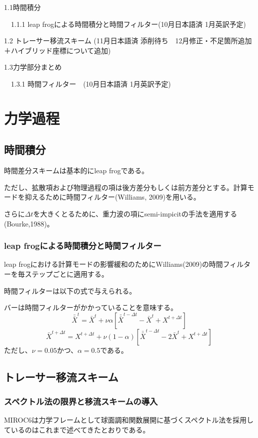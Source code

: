 \documentclass{jsbook}
\begin{document}
1.1時間積分

　1.1.1 leap frogによる時間積分と時間フィルター(10月日本語済 1月英訳予定)

1.2 トレーサー移流スキーム (11月日本語済 添削待ち　12月修正・不足箇所追加＋ハイブリッド座標について追加)

1.3力学部分まとめ

　1.3.1 時間フィルター　(10月日本語済 1月英訳予定)
\chapter{力学過程}
\section{時間積分}
時間差分スキームは基本的にleap frogである。

ただし、拡散項および物理過程の項は後方差分もしくは前方差分とする。計算モードを抑えるために時間フィルター(Williams, 2009)を用いる。

さらに$\Delta t$を大きくとるために、重力波の項にsemi-impicitの手法を適用する(Bourke,1988)。
\subsection{leap frogによる時間積分と時間フィルター}
leap frogにおける計算モードの影響緩和のためにWilliams(2009)の時間フィルターを毎ステップごとに適用する。

時間フィルターは以下の式で与えられる。

バーは時間フィルターがかかっていることを意味する。
\begin{equation}   
\bar{\bar{X}}^{t} = \bar{X}^{t} + \nu \alpha [\bar{\bar{X}}^{t-\Delta t} - \bar{X}^{t} + X^{t+\Delta t}] 
\end{equation}
\begin{equation}   
\bar{X}^{t+\Delta t} = X^{t+\Delta t} + \nu (1-\alpha) [\bar{\bar{X}}^{t-\Delta t} - 2 \bar{X}^{t} + X^{t+\Delta t}] 
\end{equation}
ただし、$\nu=0.05$かつ、$\alpha=0.5$である。
\section{トレーサー移流スキーム}
\subsection{スペクトル法の限界と移流スキームの導入}
MIROC6は力学フレームとして球面調和関数展開に基づくスペクトル法を採用しているのはこれまで述べてきたとおりである。
\end{document}
